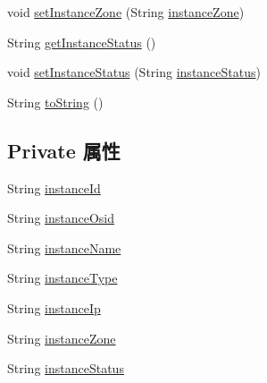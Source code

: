 \begin{DoxyCompactItemize}
\item 
void \mbox{\hyperlink{classcom_1_1example_1_1demo_1_1modular_1_1_instance_a6f57f9db0c230e2e7f685700a74fc505}{set\+Instance\+Zone}} (String \mbox{\hyperlink{classcom_1_1example_1_1demo_1_1modular_1_1_instance_a0076c0dc1b90032ac314eca30728df1e}{instance\+Zone}})
\item 
String \mbox{\hyperlink{classcom_1_1example_1_1demo_1_1modular_1_1_instance_a57cd6f0bbc78c50a1dd50200f20b7eb2}{get\+Instance\+Status}} ()
\item 
void \mbox{\hyperlink{classcom_1_1example_1_1demo_1_1modular_1_1_instance_a966b63994712c823d7f7f55c4042646c}{set\+Instance\+Status}} (String \mbox{\hyperlink{classcom_1_1example_1_1demo_1_1modular_1_1_instance_a45db58c16ddf36f66834df9b73a743cc}{instance\+Status}})
\item 
String \mbox{\hyperlink{classcom_1_1example_1_1demo_1_1modular_1_1_instance_adeb1ca06837b690559c343ccd8145768}{to\+String}} ()
\end{DoxyCompactItemize}
\subsection*{Private 属性}
\begin{DoxyCompactItemize}
\item 
String \mbox{\hyperlink{classcom_1_1example_1_1demo_1_1modular_1_1_instance_afa844472164fc3e313d84e932a4387b2}{instance\+Id}}
\item 
String \mbox{\hyperlink{classcom_1_1example_1_1demo_1_1modular_1_1_instance_a7c495785ea43e2bb2a6b020d5d69320b}{instance\+Osid}}
\item 
String \mbox{\hyperlink{classcom_1_1example_1_1demo_1_1modular_1_1_instance_a65743efcb65b8f31fc68e0b8847c7210}{instance\+Name}}
\item 
String \mbox{\hyperlink{classcom_1_1example_1_1demo_1_1modular_1_1_instance_a9e0d75275c0425596d09c47713ba8572}{instance\+Type}}
\item 
String \mbox{\hyperlink{classcom_1_1example_1_1demo_1_1modular_1_1_instance_a7ba10b77832f3bbdd546111ae007090d}{instance\+Ip}}
\item 
String \mbox{\hyperlink{classcom_1_1example_1_1demo_1_1modular_1_1_instance_a0076c0dc1b90032ac314eca30728df1e}{instance\+Zone}}
\item 
String \mbox{\hyperlink{classcom_1_1example_1_1demo_1_1modular_1_1_instance_a45db58c16ddf36f66834df9b73a743cc}{instance\+Status}}
\end{DoxyCompactItemize}


